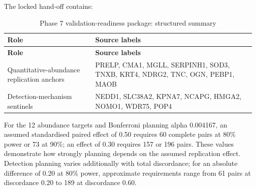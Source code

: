 The locked hand-off contains:

\begin{longtable}{@{}>{\raggedright\arraybackslash}p{} >{\raggedright\arraybackslash}p{}@{}}
\caption{Phase 7 validation-readiness package: structured summary}\\
\toprule
\textbf{Role} & \textbf{Source labels} \\
\midrule
\endfirsthead
\toprule
\textbf{Role} & \textbf{Source labels} \\
\midrule
\endhead
Quantitative-abundance replication anchors & PRELP, CMA1, MGLL, SERPINH1, SOD3, TNXB, KRT4, NDRG2, TNC, OGN, PEBP1, MAOB \\
Detection-mechanism sentinels & NEDD1, SLC38A2, KPNA7, NCAPG, HMGA2, NOMO1, WDR75, POP4 \\
\bottomrule
\end{longtable}

For the 12 abundance targets and Bonferroni planning alpha 0.004167, an assumed standardised paired effect of 0.50 requires 60 complete pairs at 80\% power or 73 at 90\%; an effect of 0.30 requires 157 or 196 pairs. These values demonstrate how strongly planning depends on the assumed replication effect. Detection planning varies additionally with total discordance; for an absolute difference of 0.20 at 80\% power, approximate requirements range from 61 pairs at discordance 0.20 to 189 at discordance 0.60.
